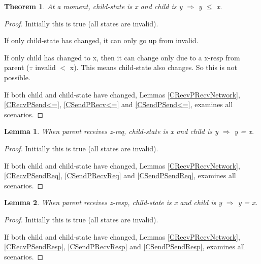 \documentclass{article}
\newtheorem{theorem}{Theorem}
\newtheorem{lemma}{Lemma}
\begin{document}
\begin{theorem}
At a moment, child-state is x and child is y $\Rightarrow$ y $\le$ x.
\label{<=}
\end{theorem}

\begin{proof}
Initially this is true (all states are invalid).

If only child-state has changed, it can only go up from invalid.

If only child has changed to x, then it can change only due to a x-resp from parent ($\because$ invalid $<$ x). This means child-state also changes. So this is not possible.

If both child and child-state have changed, Lemmas \ref{CRecvPRecvNetwork}, \ref{CRecvPSend<=}, \ref{CSendPRecv<=} and \ref{CSendPSend<=}, examines all scenarios.
\end{proof}

\begin{lemma}
When parent receives z-req, child-state is x and child is y $\Rightarrow$ y = x.
\label{Req=}
\end{lemma}

\begin{proof}
Initially this is true (all states are invalid).

If both child and child-state have changed, Lemmas \ref{CRecvPRecvNetwork}, \ref{CRecvPSendReq}, \ref{CSendPRecvReq} and \ref{CSendPSendReq}, examines all scenarios.
\end{proof}

\begin{lemma}
When parent receives z-resp, child-state is x and child is y $\Rightarrow$ y = x.
\label{Resp=}
\end{lemma}

\begin{proof}
Initially this is true (all states are invalid).

If both child and child-state have changed, Lemmas \ref{CRecvPRecvNetwork}, \ref{CRecvPSendResp}, \ref{CSendPRecvResp} and \ref{CSendPSendResp}, examines all scenarios.
\end{proof}
\end{document}
